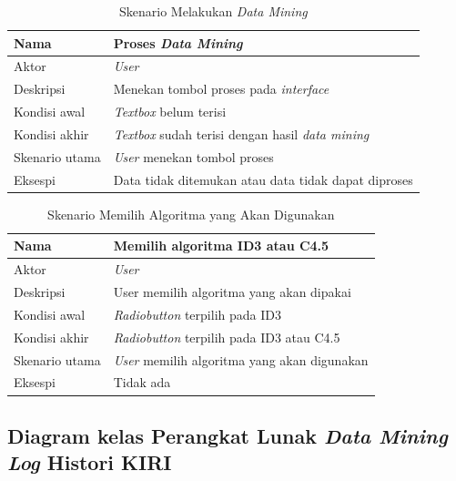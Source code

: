 \begin{table}[H]
\caption{Skenario Melakukan \textsl{Data Mining}}
\begin{tabular}{|l|l|}
\hline
Nama           & Proses \textsl{Data Mining }                      								\\ \hline
Aktor          & \textit{User}                                 										\\ \hline
Deskripsi      & Menekan tombol proses pada \textsl{interface}       					    \\ \hline
Kondisi awal   & \textsl{Textbox} belum terisi                          					\\ \hline
Kondisi akhir  & \textsl{Textbox} sudah terisi dengan hasil \textsl{data mining}  \\ \hline
Skenario utama & \textit{User} menekan tombol proses         										  \\ \hline
Eksespi        & Data tidak ditemukan atau data tidak dapat diproses    		  	  \\ \hline
\end{tabular}
\end{table}

\begin{table}[H]
\caption{Skenario Memilih Algoritma yang Akan Digunakan}
\begin{tabular}{|l|l|}
\hline
Nama           & Memilih algoritma ID3 atau C4.5                     \\ \hline
Aktor          & \textit{User}                                       \\ \hline
Deskripsi      & User memilih algoritma yang akan dipakai            \\ \hline
Kondisi awal   & \textsl{Radiobutton} terpilih pada ID3              \\ \hline
Kondisi akhir  & \textsl{Radiobutton} terpilih pada ID3 atau C4.5    \\ \hline
Skenario utama & \textit{User} memilih algoritma yang akan digunakan \\ \hline
Eksespi        & Tidak ada																					 \\ \hline
\end{tabular}
\end{table}


\subsection{Diagram kelas Perangkat Lunak \textsl{Data Mining Log} Histori KIRI}

